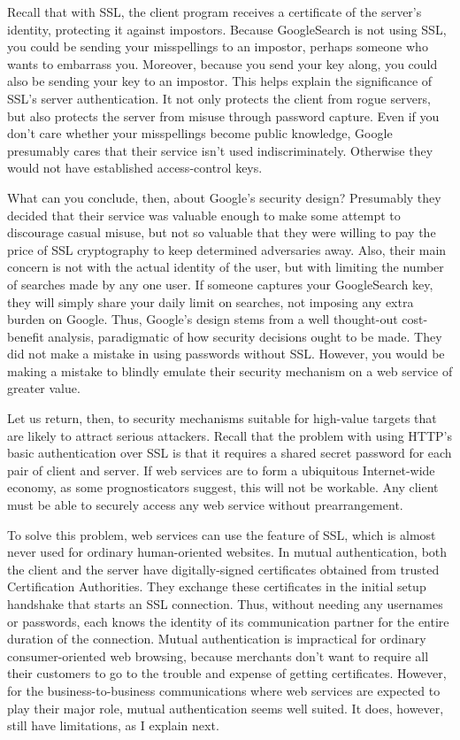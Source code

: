 Recall that with SSL, the client program receives a certificate of the
server's identity, protecting it against impostors.  Because
GoogleSearch is not using SSL, you could be sending your misspellings
to an impostor, perhaps someone who wants to embarrass you.  Moreover,
because you send your key along, you could also be sending your key to
an impostor.  This helps explain the significance of SSL's server
authentication.  It not only protects the client from rogue servers,
but also protects the server from misuse through password capture.
Even if you don't care whether your misspellings become public
knowledge, Google presumably cares that their service isn't used
indiscriminately.  Otherwise they would not have established
access-control keys.

What can you conclude, then, about Google's security design?
Presumably they decided that their service was valuable enough to make
some attempt to discourage casual misuse, but not so valuable that
they were willing to pay the price of SSL cryptography to keep
determined adversaries away.  Also, their main concern is not with the
actual identity of the user, but with limiting the number of searches
made by any one user.  If someone captures your GoogleSearch key, they
will simply share your daily limit on searches, not imposing any extra
burden on Google.  Thus, Google's design stems from a well thought-out
cost-benefit analysis, paradigmatic of how security decisions ought to
be made.  They did not make a mistake in using passwords without SSL.
However, you would be making a mistake to blindly emulate their
security mechanism on a web service of greater value.

Let us return, then, to security mechanisms suitable for high-value
targets that are likely to attract serious attackers.  Recall that the problem
with using HTTP's basic authentication over SSL is that it requires a
shared secret password for each pair of client and server.  If web
services are to form a ubiquitous Internet-wide economy, as some
prognosticators suggest, this will not be workable.  Any client must be able
to securely access any web service without prearrangement.

To solve this problem, web services can use the
 feature of SSL, which is almost
never used for ordinary human-oriented websites.  In mutual
authentication, both the client and the server have digitally-signed
certificates obtained from trusted Certification Authorities.  They
exchange these certificates in the initial setup handshake that starts
an SSL connection.  Thus, without needing any usernames or passwords,
each knows the identity of its communication partner for the entire
duration of the connection.  Mutual authentication is impractical for
ordinary consumer-oriented web browsing, because merchants don't want
to require all their customers to go to the trouble and expense of
getting certificates.  However, for the business-to-business
communications where web services are expected to play their major
role, mutual authentication seems well suited.  It does, however,
still have limitations, as I explain next.

